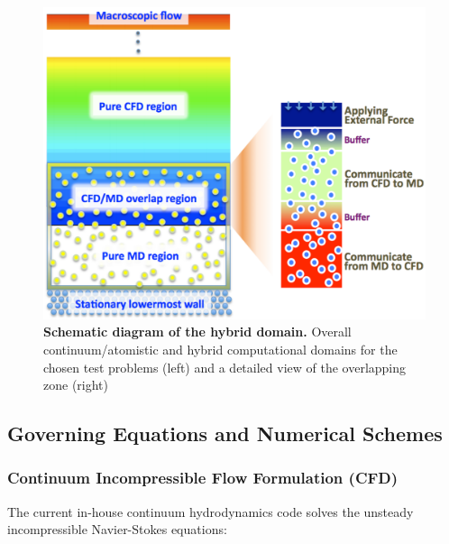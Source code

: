 \documentclass[preprint,12pt]{elsarticle}
\newcommand{\Nkimnote}[1]{ {\textcolor{blue} { ***NKim: #1 }}}
\newcommand{\Nkimnote}[1]{}
\begin{document}
\begin{figure}
\centering
\includegraphics[width=0.8\linewidth]{Hybrid_Schematic.pdf}
\vskip-0.2cm
\caption{\small 
{\bf Schematic diagram of the hybrid domain.}
Overall continuum/atomistic and hybrid computational domains for the chosen test problems (left) and a detailed view of the overlapping zone (right)
}
\label{Fig:Couette}
\vspace{-1em}
\end{figure}



\subsection{Governing Equations and Numerical Schemes}

\subsubsection{Continuum Incompressible Flow Formulation (CFD)}

The current in-house continuum hydrodynamics code solves the unsteady incompressible Navier-Stokes equations: 
\end{document}
